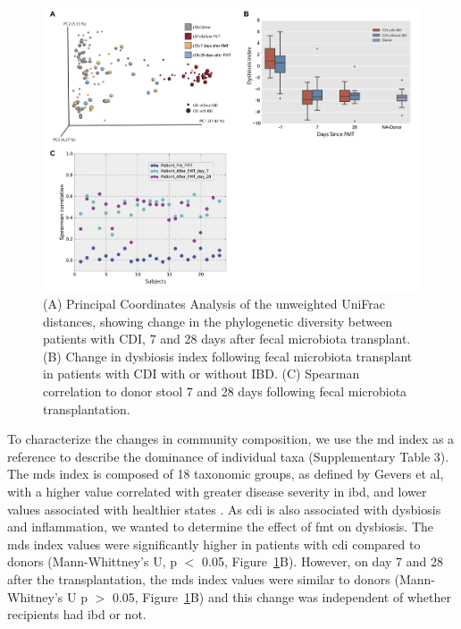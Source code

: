 \begin{figure}
\centering
\includegraphics[width=0.8\textheight]{fmt-figures/figure-1}
\caption[Dysbiosis index and beta-diversity summaries pre- and post-fecal microbiota transplantation]{(A) Principal Coordinates Analysis of the unweighted UniFrac distances, showing change in the phylogenetic diversity between patients with CDI, 7 and 28 days after fecal microbiota transplant. (B) Change in dysbiosis index following fecal microbiota transplant in patients with CDI with or without IBD. (C) Spearman correlation to donor stool 7 and 28 days following fecal microbiota transplantation.}
\label{fmt-fig1}
\end{figure}

To characterize the changes in community composition, we use the \gls{md} index as a reference to describe the dominance of individual taxa (Supplementary Table 3). The \glspl{md} index is composed of 18 taxonomic groups, as defined by Gevers et al, with a higher value correlated with greater disease severity in \gls{ibd}, and lower values associated with healthier states \cite{RN1489}. As \gls{cdi} is also associated with dysbiosis and inflammation, we wanted to determine the effect of \gls{fmt} on dysbiosis. The \glspl{md} index values were significantly higher in patients with \gls{cdi} compared to donors (Mann-Whittney's U, p $<$ 0.05, Figure~\ref{fmt-fig1}B). However, on day 7 and 28 after the transplantation, the \glspl{md} index values were similar to donors (Mann-Whitney's U p $>$ 0.05, Figure~\ref{fmt-fig1}B) and this change was independent of whether recipients had \gls{ibd} or not. 

